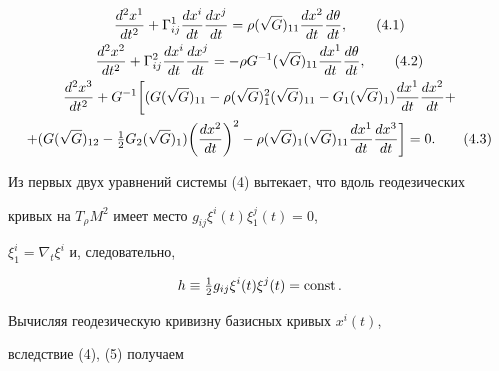 \begin{gather} 


\frac{d^2x^1}{d t^2}+\Gamma^1_{i j} 


\frac{d x^i}{d t}\frac{d x^j}{d t}=\rho(\sqrt{G})_{11} 


\frac{d x^2}{d t}\frac{d\theta}{d t},\tag{4.1} \\ 


% 


\frac{d^2x^2}{d t^2}+\Gamma^2_{i j}\frac{d x^i}{d t} 


\frac{d x^j}{d t}=-\rho G^{-1}(\sqrt{G})_{11} 


\frac{d x^1}{d t}\frac{d\theta}{d t},\tag{4.2} \\ 


% 


\frac{d^2x^3}{d t^2}+G^{-1}\bigg[(G(\sqrt{G})_{11}- 


\rho(\sqrt{G})^2_1(\sqrt{G})_{11}-G_1(\sqrt{G})_1) 


\frac{d x^1}{d t}\frac{d x^2}{d t}+ \notag \\ 


% 


+(G(\sqrt{G})_{12}-\tfrac{1}{2}G_2(\sqrt{G})_1) 


\bigg(\frac{d x^2}{d t} \bigg)^2-\rho(\sqrt{G})_1 


(\sqrt{G})_{11}\frac{d x^1}{d t}\frac{d x^3}{d t}\bigg]=0.\tag{4.3} 


\end{gather} 


 


Из первых двух уравнений системы (4) вытекает, что вдоль геодезических 


кривых на $T_\rho M^2$ имеет место $g_{i j}\xi^i(t)\xi^j_1(t)=0$, 


$\xi^i_1=\nabla_t\xi^i$ и, следовательно, 


\begin{equation} 


h\equiv \tfrac{1}{2}g_{i j}\xi^i(t)\xi^j(t)=\const. 


\end{equation} 


Вычисляя геодезическую кривизну базисных кривых $x^i(t)$, 


вследствие (4), (5) получаем 


